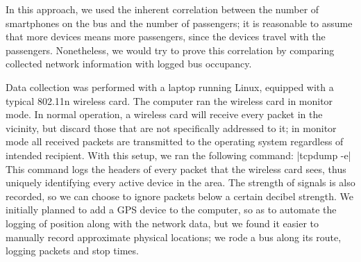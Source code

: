 In this approach, we used the inherent correlation between the number of smartphones on the bus and the number of passengers; it is reasonable to assume that more devices means more passengers, since the devices travel with the passengers.
Nonetheless, we would try to prove this correlation by comparing collected network information with logged bus occupancy.

Data collection was performed with a laptop running Linux, equipped with a typical 802.11n wireless card.
The computer ran the wireless card in monitor mode.
In normal operation, a wireless card will receive every packet in the vicinity, but discard those that are not specifically addressed to it; in monitor mode all received packets are transmitted to the operating system regardless of intended recipient. With this setup, we ran the following command:
|tcpdump -e|
This command logs the headers of every packet that the wireless card sees, thus uniquely identifying every active device in the area.
The strength of signals is also recorded, so we can choose to ignore packets below a certain decibel strength.
We initially planned to add a GPS device to the computer, so as to automate the logging of position along with the network data, but we found it easier to manually record approximate physical locations; we rode a bus along its route, logging packets and stop times.
